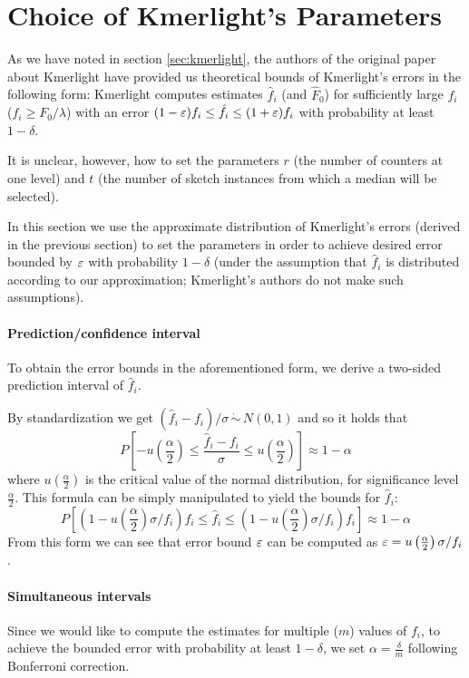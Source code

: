 \section{Choice of Kmerlight's Parameters}
\label{sec:parameters-choice}

As we have noted in section \ref{sec:kmerlight},
the authors of the original paper about Kmerlight \cite{Sivadasan2016} have
provided us theoretical bounds of Kmerlight's errors in the following form:
Kmerlight computes estimates $\hat f_i$ (and $\hat F_0$) for sufficiently large
$f_i$ ($f_i \geq F_0 / \lambda$) with an error $(1-\varepsilon)f_i \leq \hat f_i \leq (1+\varepsilon)f_i$
with probability at least $1 - \delta$.

It is unclear, however, how to set the parameters $r$ (the number of counters at one level) 
and $t$ (the number of sketch instances from which a median will be selected).

In this section we use the approximate distribution of Kmerlight's errors (derived in the
previous section) to set the parameters in order to achieve
desired error bounded by $\varepsilon$ with probability $1-\delta$ (under the assumption that 
$\hat f_i$ is distributed according to our approximation; Kmerlight's authors do not make
such assumptions).

\paragraph{Prediction/confidence interval} To obtain the error bounds
in the aforementioned form, we derive a two-sided prediction interval of $\hat f_i$. 

By standardization we get $(\hat f_i - f_i)/\sigma \,\dot\sim\, N(0,1)$ and so it holds that
$$P\left[-u\left(\frac{\alpha}{2}\right) \leq 
\frac{\hat f_i - f_i}{\sigma} \leq 
u\left(\frac{\alpha}{2}\right) \right] \approx 1 - \alpha$$
where $u\left(\frac{\alpha}{2}\right)$ is the critical value of the normal distribution,
for significance level $\frac{\alpha}{2}$. This formula can be simply
manipulated to yield the bounds for $\hat f_i$:
$$P\left[\left(1-u\left(\frac{\alpha}{2}\right)\sigma/f_i\right) f_i \leq \hat f_i \leq \left(1-u\left(\frac{\alpha}{2}\right)\sigma/f_i\right) f_i \right] \approx 1 - \alpha$$
From this form we can see that error bound $\varepsilon$ can be computed as
$\varepsilon = u\left(\frac{\alpha}{2}\right)\sigma/f_i$.

\paragraph{Simultaneous intervals} Since we would like to compute the estimates
for multiple ($m$) values of $f_i$, to achieve the bounded error with probability at least
$1 - \delta$, we set $\alpha = \frac{\delta}{m}$ following Bonferroni correction.

